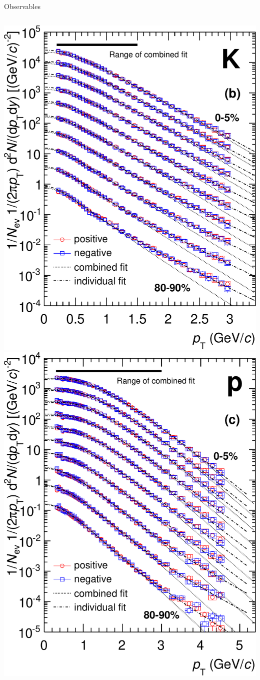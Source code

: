 \documentclass{beamer}
\begin{document}
\begin{frame}{Observables}
\begin{columns}
\begin{columns}[c]
      \includegraphics[width=\textwidth]{expdata/alice-spectra-1} \\
      \includegraphics[width=\textwidth]{expdata/alice-spectra-2}

\end{columns}
\end{columns}
\end{frame}
\end{document}
